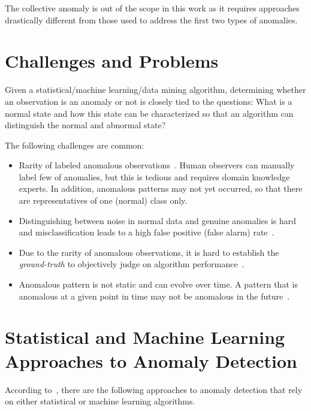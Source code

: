 The collective anomaly is out of the scope in this work as it requires approaches drastically different from those used to address the first two types of anomalies.

\section{Challenges and Problems}\label{challenges}
Given a statistical/machine learning/data mining algorithm, determining whether an observation is an anomaly or not is closely tied to the questions: What is a normal state and how this state can be characterized so that an algorithm can distinguish the normal and abnormal state? 

The following challenges are common:
\begin{itemize}
    \item Rarity of labeled anomalous observations~\cite{Weiss:2004:MRU:1007730.1007734}. Human observers can manually label few of anomalies, but this is tedious and requires domain knowledge experts. In addition, anomalous patterns may not yet occurred, so that there are representatives of one (normal) class only.
    
    \item Distinguishing between noise in normal data and genuine anomalies is hard and misclassification leads to a high false positive (false alarm) rate~\cite{Chandola:2009:ADS:1541880.1541882}.   %

    \item Due to the rarity of anomalous observations, it is hard to establish the \textit{ground-truth} to objectively judge on algorithm performance~\cite{Aggarwal:2013}. %
    
    \item Anomalous pattern is not static and can evolve over time. A pattern that is anomalous at a given point in time may not be anomalous in the future~\cite{Chandola:2009:ADS:1541880.1541882}.
\end{itemize}

\section{Statistical and Machine Learning Approaches to Anomaly Detection}\label{approaches2problem}
According to~\cite{Aggarwal:2013}, there are the following approaches to anomaly detection that rely on either statistical or machine learning algorithms.

